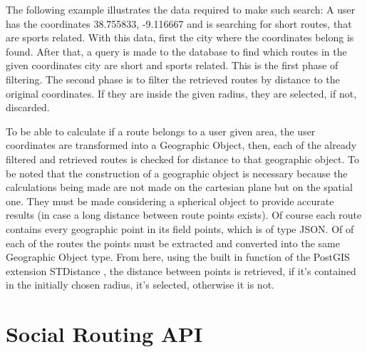     The following example illustrates the data required to make such search:
    A user has the coordinates 38.755833, -9.116667 and is searching for short routes, that are sports related.
    With this data, first the city where the coordinates belong is found. After that, a query is made to the database
    to find which routes in the given coordinates city are short and sports related. This is the first phase of filtering.
    The second phase is to filter the retrieved routes by distance to the original coordinates. If they are inside the 
    given radius, they are selected, if not, discarded.

    To be able to calculate if a route belongs to a user given area, the user coordinates are transformed into a Geographic Object\cite{geographicobject},
    then, each of the already filtered and retrieved routes is checked for distance to that geographic object. To be noted that the construction of a geographic
    object is necessary because the calculations being made are not made on the cartesian plane but on the spatial one. They must be made considering a spherical 
    object to provide accurate results (in case a long distance between route points exists). Of course each route contains every geographic point in its field points,
    which is of type JSON. Of of each of the routes the points must be extracted and converted into the same Geographic Object type. From here, using the built in function
    of the PostGIS extension STDistance \cite{stdistance}, the distance between points is retrieved, if it's contained in the initially 
    chosen radius, it's selected, otherwise it is not.

\section{Social Routing API} \label{apisection}   
